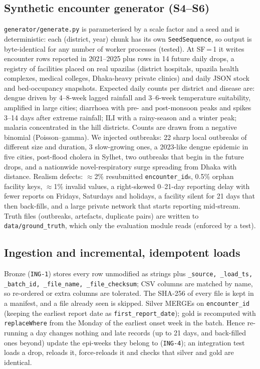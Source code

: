 \documentclass[conference]{IEEEtran}
\newcommand{\req}[1]{\texttt{#1}}
\begin{document}
\subsection{Synthetic encounter generator (S4--S6)}
\texttt{generator/generate.py} is parameterised by a scale factor and a seed and is deterministic: each
(district, year) chunk has its own \texttt{SeedSequence}, so output is byte-identical for any number of
worker processes (tested). At SF\,=\,1 it writes \GenRows{} encounter rows reported in 2021--2025 plus
\GenDropRows{} rows in 14 future daily drops, a registry of \GenFacilities{} facilities placed on real
upazilas (district hospitals, upazila health complexes, medical colleges, Dhaka-heavy private clinics) and
daily JSON stock and bed-occupancy snapshots. Expected daily counts per district and disease are:
dengue driven by 4--8-week lagged rainfall and 3--6-week temperature suitability, amplified in large cities;
diarrhoea with pre- and post-monsoon peaks and spikes 3--14 days after extreme rainfall; ILI with a
rainy-season and a winter peak; malaria concentrated in the hill districts. Counts are drawn from a
negative binomial (Poisson--gamma). We injected \GenOutbreaks{} outbreaks: 22 sharp local outbreaks of
different size and duration, 3 slow-growing ones, a 2023-like dengue epidemic in five cities, post-flood
cholera in Sylhet, two outbreaks that begin in the future drops, and a nationwide novel-respiratory surge
spreading from Dhaka with distance. Realism defects: $\approx$2\% resubmitted \texttt{encounter\_id}s,
0.5\% orphan facility keys, $\approx$1\% invalid values, a right-skewed 0--21-day reporting delay with fewer
reports on Fridays, Saturdays and holidays, a facility silent for 21 days that then back-fills, and a large
private network that starts reporting mid-stream. Truth files (outbreaks, artefacts, duplicate pairs) are
written to \texttt{data/ground\_truth}, which only the evaluation module reads (enforced by a test).

\subsection{Ingestion and incremental, idempotent loads}\label{sec:inc}
Bronze (\req{ING-1}) stores every row unmodified as strings plus \texttt{\_source, \_load\_ts, \_batch\_id,
\_file\_name, \_file\_checksum}; CSV columns are matched by name, so re-ordered or extra columns are tolerated.
The SHA-256 of every file is kept in a manifest, and a file already seen is skipped. Silver MERGEs on
\texttt{encounter\_id} (keeping the earliest report date as \texttt{first\_report\_date}); gold is recomputed
with \texttt{replaceWhere} from the Monday of the earliest onset week in the batch. Hence re-running a day
changes nothing and late records (up to 21 days, and back-filled ones beyond) update the epi-weeks they
belong to (\req{ING-4}); an integration test loads a drop, reloads it, force-reloads it and checks that silver
and gold are identical.
\end{document}
